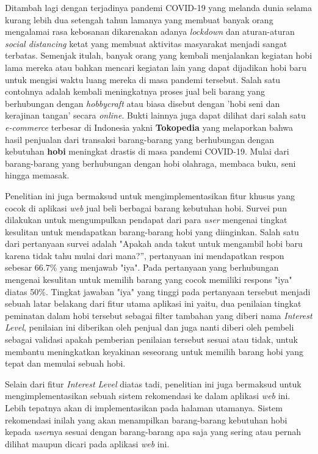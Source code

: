 \documentclass[a4paper]{article}
\begin{document}
Ditambah lagi dengan terjadinya pandemi COVID-19 yang melanda dunia selama kurang lebih dua setengah tahun lamanya yang membuat banyak orang mengalamai rasa kebosanan\autocite{boredom-in-covid-19-pandemic} dikarenakan adanya \textit{lockdown} dan aturan-aturan \textit{social distancing} ketat yang membuat aktivitas masyarakat menjadi sangat terbatas. Semenjak itulah, banyak orang yang kembali menjalankan kegiatan hobi lama mereka atau bahkan mencari kegiatan lain yang dapat dijadikan hobi baru untuk mengisi waktu luang mereka di masa pandemi tersebut. Salah satu contohnya adalah kembali meningkatnya proses jual beli barang yang berhubungan dengan \textit{hobbycraft} atau biasa disebut dengan 'hobi seni dan kerajinan tangan' secara \textit{online}\autocite{hobbycraft-fast-online-growth}. Bukti lainnya juga dapat dilihat dari salah satu \textit{e-commerce} terbesar di Indonesia yakni \textbf{Tokopedia} yang melaporkan bahwa hasil penjualan dari transaksi barang-barang yang berhubungan dengan kebutuhan \textbf{hobi} meningkat drastis di masa pandemi COVID-19. Mulai dari barang-barang yang berhubungan dengan hobi olahraga, membaca buku, seni hingga memasak\autocite{tokped-hobbies-goods-sales-increased}.

Penelitian ini juga bermaksud untuk mengimplementasikan fitur khusus yang cocok di aplikasi \textit{web} jual beli berbagai barang kebutuhan hobi. Survei pun dilakukan untuk mengumpulkan pendapat dari para \textit{user} mengenai tingkat kesulitan untuk mendapatkan barang-barang hobi yang diinginkan. Salah satu dari pertanyaan survei adalah "Apakah anda takut untuk mengambil hobi baru karena tidak tahu mulai dari mana?”, pertanyaan ini mendapatkan respon sebesar 66.7\% yang menjawab "iya". Pada pertanyaan yang berhubungan mengenai kesulitan untuk memilih barang yang cocok memiliki respons "iya" diatas 50\%. Tingkat jawaban "iya" yang tinggi pada pertanyaan tersebut menjadi sebuah latar belakang dari fitur utama aplikasi ini yaitu, dua penilaian tingkat peminatan dalam hobi tersebut sebagai filter tambahan yang diberi nama \textit{Interest Level}, penilaian ini diberikan oleh penjual dan juga nanti diberi oleh pembeli sebagai validasi apakah pemberian penilaian tersebut sesuai atau tidak, untuk membantu meningkatkan keyakinan seseorang untuk memilih barang hobi yang tepat dan memulai sebuah hobi.

Selain dari fitur \textit{Interest Level} diatas tadi, penelitian ini juga bermaksud untuk mengimplementasikan sebuah sistem rekomendasi ke dalam aplikasi \textit{web} ini. Lebih tepatnya akan di implementasikan pada halaman utamanya. Sistem rekomendasi inilah yang akan menampilkan barang-barang kebutuhan hobi kepada \textit{user}nya sesuai dengan barang-barang apa saja yang sering atau pernah dilihat maupun dicari pada aplikasi \textit{web} ini. 
\end{document}
